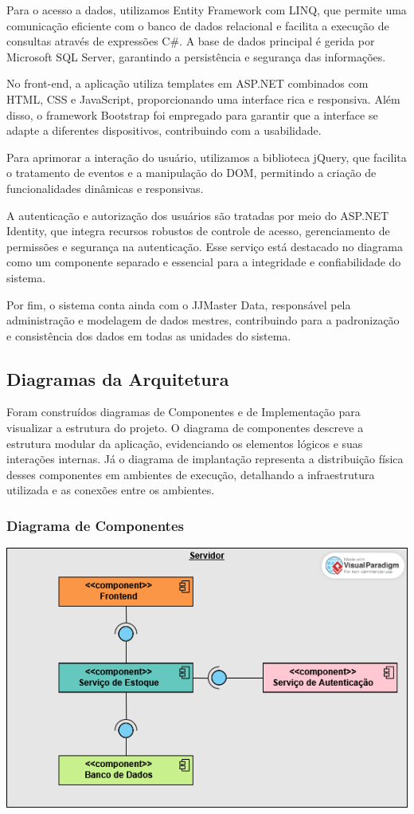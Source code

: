 \documentclass[
	12pt,				%
	openright,			%
	twoside,			%
	a4paper,			%
	english,			%
	french,				%
	spanish,			%
	brazil				%
	]{abntex2}
\begin{document}
Para o acesso a dados, utilizamos Entity Framework com LINQ, que permite uma comunicação eficiente com o banco de dados relacional e facilita a execução de consultas através de expressões C\#. A base de dados principal é gerida por Microsoft SQL Server, garantindo a persistência e segurança das informações.

No front-end, a aplicação utiliza templates em ASP.NET combinados com HTML, CSS e JavaScript, proporcionando uma interface rica e responsiva. Além disso, o framework Bootstrap foi empregado para garantir que a interface se adapte a diferentes dispositivos, contribuindo com a usabilidade.

Para aprimorar a interação do usuário, utilizamos a biblioteca jQuery, que facilita o tratamento de eventos e a manipulação do DOM, permitindo a criação de funcionalidades dinâmicas e responsivas.

A autenticação e autorização dos usuários são tratadas por meio do ASP.NET Identity, que integra recursos robustos de controle de acesso, gerenciamento de permissões e segurança na autenticação. Esse serviço está destacado no diagrama como um componente separado e essencial para a integridade e confiabilidade do sistema.

Por fim, o sistema conta ainda com o JJMaster Data, responsável pela administração e modelagem de dados mestres, contribuindo para a padronização e consistência dos dados em todas as unidades do sistema.

\subsection{Diagramas da Arquitetura}

Foram construídos diagramas de Componentes e de Implementação para visualizar a estrutura do projeto. O diagrama de componentes descreve a estrutura modular da aplicação, evidenciando os elementos lógicos e suas interações internas. Já o diagrama de implantação representa a distribuição física desses componentes em ambientes de execução, detalhando a infraestrutura utilizada e as conexões entre os ambientes.


\subsubsection{Diagrama de Componentes}


\includegraphics[width=1.0\textwidth]{Figuras/Componentes.png}
\end{document}
